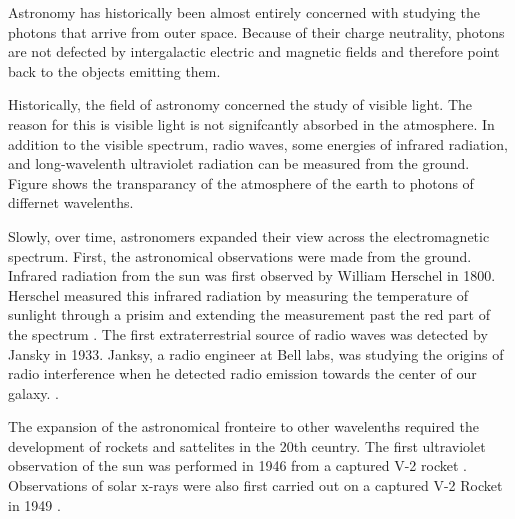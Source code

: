 
Astronomy has historically been almost entirely concerned with studying
the photons that arrive from outer space.  Because of their charge
neutrality, photons are not defected by intergalactic electric and
magnetic fields and therefore point back to the objects 
emitting them. 

Historically, the field of astronomy concerned
the study of visible light. The reason for this is visible light
is not signifcantly absorbed in the atmosphere. 
In addition to the visible spectrum, radio waves, some
energies of infrared radiation, and long-wavelenth ultraviolet
radiation can be measured from the ground. Figure
 shows the transparancy
of the atmosphere of the earth to photons of differnet wavelenths.

Slowly, over time, astronomers expanded their view across the
electromagnetic spectrum.  First, the astronomical observations
were made from the ground.  Infrared radiation from the sun was
first observed by William Herschel in 1800. Herschel measured this
infrared radiation by measuring the temperature of sunlight through
a prisim and extending the measurement past the red part of the
spectrum \citep{herschel_1800_experiments-refrangibility}.  The first
extraterrestrial source of radio waves was detected by Jansky in 1933.
Janksy, a radio engineer at Bell labs, was studying the
origins of radio interference when he detected radio emission towards
the center of our galaxy.
\citep{jansky_1933_electrical-disturbances}.

The expansion of the astronomical fronteire to other wavelenths required
the development of rockets and sattelites in the 20th ceuntry.  The first
ultraviolet observation of the sun was performed in 1946 from a captured
V-2 rocket \citep{baum_1946_ultraviolet-spectrum}.  Observations of
solar x-rays were also first carried out on a captured V-2 Rocket in
1949 \citep{burnight_1949_x-radiation-atmosphere}.
